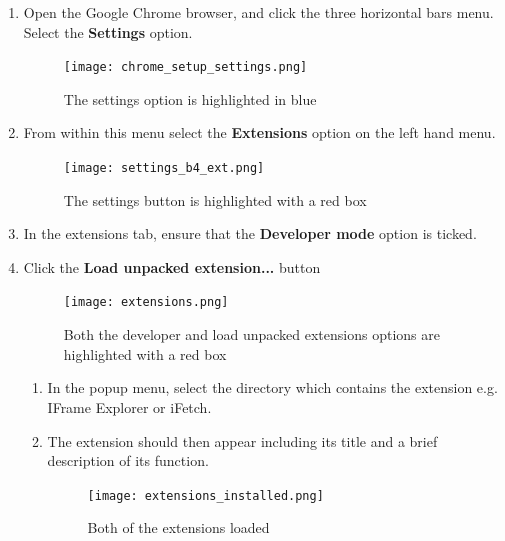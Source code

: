 \documentclass[12pt]{article}
\begin{document}
\begin{enumerate}
    \item Open the Google Chrome browser, and click the three horizontal bars menu. Select the \textbf{Settings} option. 
    
    \begin{figure}[H]
        \centering
        \texttt{[image: chrome\_setup\_settings.png]}
        \caption{The settings option is highlighted in blue}
        \label{fig:chrome_setup_settings}
    \end{figure}
    
    \item From within this menu select the \textbf{Extensions} option on the left hand menu.
    
    \begin{figure}[H]
        \centering
        \texttt{[image: settings\_b4\_ext.png]}
        \caption{The settings button is highlighted with a red box}
        \label{fig:settings_before_ext}
    \end{figure}

    
    \item In the extensions tab, ensure that the \textbf{Developer mode} option is ticked. 
    \item Click the \textbf{Load unpacked extension...} button
    
    \begin{figure}[H]
        \centering
        \texttt{[image: extensions.png]}
        \caption{Both the developer and load unpacked extensions options are highlighted with a red box}
        \label{fig:extensions}
    \end{figure}
    
    \begin{enumerate}
        \item In the popup menu, select the directory which contains the extension e.g. IFrame Explorer or iFetch. 
        \item The extension should then appear including its title and a brief description of its function.
        
        \begin{figure}[H]
            \centering
            \texttt{[image: extensions\_installed.png]}
            \caption{Both of the extensions loaded}
            \label{fig:extensions_installed}
        \end{figure}
        
    \end{enumerate}
\end{enumerate}
\end{document}
